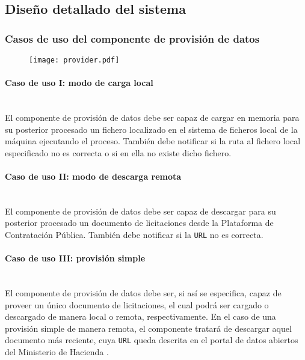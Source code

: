     
    \subsection{Diseño detallado del sistema} \label{subsec:detallado}
        \subsubsection{Casos de uso del componente de provisión de datos}
    
            \begin{figure}[h]
                \centering
                \texttt{[image: provider.pdf]}
                \label{fig:provider}
            \end{figure}
            
            \paragraph{Caso de uso I: modo de carga local} \mbox{}\\
                El componente de provisión de datos debe ser capaz de cargar en memoria para su posterior procesado un fichero localizado en el sistema de ficheros local de la máquina ejecutando el proceso. También debe notificar si la ruta al fichero local especificado no es correcta o si en ella no existe dicho fichero.
                
            \paragraph{Caso de uso II: modo de descarga remota} \mbox{}\\
                El componente de provisión de datos debe ser capaz de descargar para su posterior procesado un documento de licitaciones desde la Plataforma de Contratación Pública. También debe notificar si la \texttt{URL} no es correcta.
            
            \paragraph{Caso de uso III: provisión simple} \mbox{}\\
                El componente de provisión de datos debe ser, si así se especifica, capaz de proveer un único documento de licitaciones, el cual podrá ser cargado o descargado de manera local o remota, respectivamente. En el caso de una provisión simple de manera remota, el componente tratará de descargar aquel documento más reciente, cuya \texttt{URL} \cite{LICIDIA} queda descrita en el portal de datos abiertos del Ministerio de Hacienda \cite{PORTALHAC}.
                
